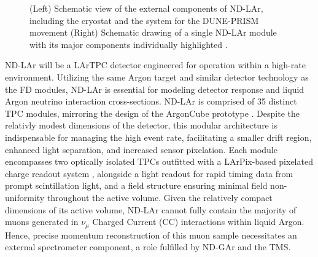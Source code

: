 \begin{figure}[!t]
\begin{subfigure}[b]{0.39\textwidth}
         \caption{}
         \label{fig:NDLArModule}
     \end{subfigure}
        \caption[Schematic view of ND-LAr.]{(Left) Schematic view of the external components of ND-LAr, including the cryostat and the system for the DUNE-PRISM movement (Right) Schematic drawing of a single ND-LAr module with its major components individually highlighted \cite{Battisti:2022ND}.}
        \label{fig:ND-Larview}
\end{figure}

ND-LAr will be a LArTPC detector engineered for operation within a high-rate environment. Utilizing the same Argon target and similar detector technology as the FD modules, ND-LAr is essential for modeling detector response and liquid Argon neutrino interaction cross-sections. ND-LAr is comprised of 35 distinct TPC modules, mirroring the design of the ArgonCube prototype \cite{Dwyer:2018phu}. Despite the relativly modest dimensions of the detector, this modular architecture is indispensable for managing the high event rate, facilitating a smaller drift region, enhanced light separation, and increased sensor pixelation. Each module encompasses two optically isolated TPCs outfitted with a LArPix-based pixelated charge readout system  \cite{Goldi:2018mbo}, alongside a light readout for rapid timing data from prompt scintillation light, and a field structure ensuring minimal field non-uniformity throughout the active volume. Given the relatively compact dimensions of its active volume, ND-LAr cannot fully contain the majority of muons generated in $\nu_\mu$ Charged Current (CC) interactions within liquid Argon. Hence, precise momentum reconstruction of this muon sample necessitates an external spectrometer component, a role fulfilled by ND-GAr and the TMS.

